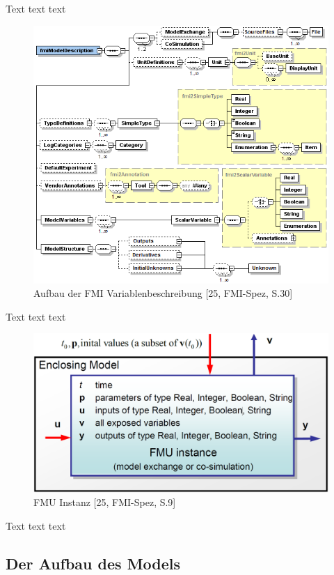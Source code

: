 \noindent Text text text
\begin{figure}[h]
	\centering
	\includegraphics[width=0.7\linewidth]{Bilder/A20_FMIOverview}
	\caption{Aufbau der FMI Variablenbeschreibung [25, FMI-Spez, S.30]}
	\label{fig:FMIOverview}
\end{figure}
\newline
\noindent Text text text
\begin{figure}[h]
	\centering
	\includegraphics[width=0.7\linewidth]{Bilder/A21_FMIBlock}
	\caption{FMU Instanz [25, FMI-Spez, S.9]}
	\label{fig:FMIBlock}
\end{figure}
\newline
\noindent Text text text

\subsection{Der Aufbau des Models}\label{sec:ModelAufbau}
